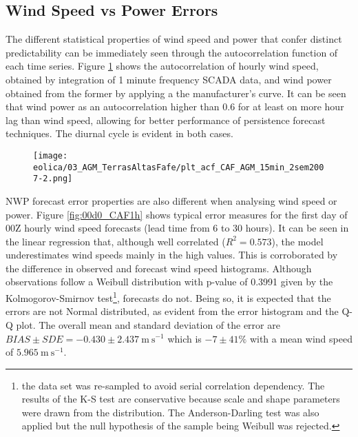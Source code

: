 \FloatBarrier
\subsection{Wind Speed vs Power Errors}

The different statistical properties of wind speed and power that confer distinct predictability can be immediately seen through the autocorrelation function of each time series. Figure \ref{fig:acf} shows the autocorrelation of hourly wind speed, obtained by integration of 1 minute frequency SCADA data, and wind power obtained from the former by applying a the manufacturer's curve. It can be seen that wind power as an autocorrelation higher than 0.6 for at least on more hour lag than wind speed, allowing for better performance of persistence forecast techniques. The diurnal cycle is evident in both cases.

\begin{figure}[!htp]
    \centering
    \texttt{[image: eolica/03\_AGM\_TerrasAltasFafe/plt\_acf\_CAF\_AGM\_15min\_2sem2007-2.png]}
    \label{fig:acf}
\end{figure}
\FloatBarrier

NWP forecast error properties are also different when analysing wind speed or power. Figure \ref{fig:00d0_CAF1h} shows typical error measures for the first day of 00Z hourly wind speed forecasts (lead time from 6 to 30 hours). It can be seen in the linear regression that, although well correlated ($R^2=0.573$), the model underestimates wind speeds mainly in the high values. This is corroborated by the difference in observed and forecast wind speed histograms. Although observations follow a Weibull distribution with p-value of 0.3991 given by the Kolmogorov-Smirnov test\footnote{the data set was re-sampled to avoid serial correlation dependency. The results of the K-S test are conservative because scale and shape parameters were drawn from the distribution. The Anderson-Darling test was also applied but the null hypothesis of the sample being Weibull was rejected.}, forecasts do not. Being so, it is expected that the errors are not Normal distributed, as evident from the error histogram and the Q-Q plot. The overall mean and standard deviation of the error are $BIAS \pm SDE = -0.430 \pm 2.437 \mathrm{\ m\ s^{-1}}$ which is $-7 \pm 41\%$ with a mean wind speed of $5.965 \mathrm{\ m\ s^{-1}}$.

